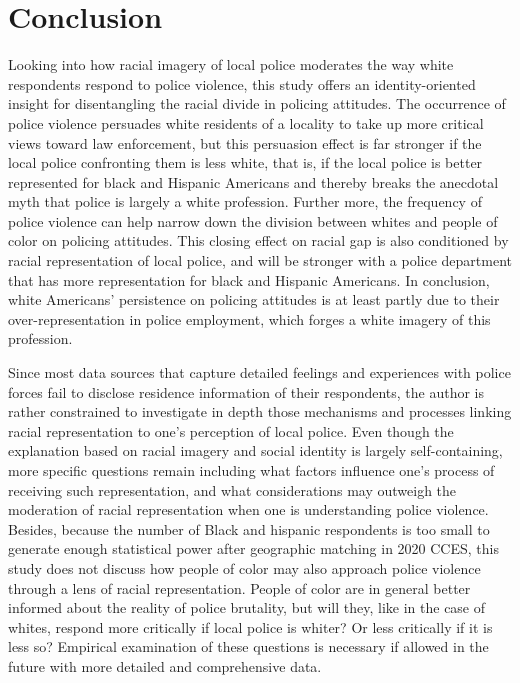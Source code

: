 \documentclass[
  12pt,
]{article}
\begin{document}
\hypertarget{conclusion}{%
\section{Conclusion}\label{conclusion}}

Looking into how racial imagery of local police moderates the way white
respondents respond to police violence, this study offers an
identity-oriented insight for disentangling the racial divide in
policing attitudes. The occurrence of police violence persuades white
residents of a locality to take up more critical views toward law
enforcement, but this persuasion effect is far stronger if the local
police confronting them is less white, that is, if the local police is
better represented for black and Hispanic Americans and thereby breaks
the anecdotal myth that police is largely a white profession. Further
more, the frequency of police violence can help narrow down the division
between whites and people of color on policing attitudes. This closing
effect on racial gap is also conditioned by racial representation of
local police, and will be stronger with a police department that has
more representation for black and Hispanic Americans. In conclusion,
white Americans' persistence on policing attitudes is at least partly
due to their over-representation in police employment, which forges a
white imagery of this profession.

Since most data sources that capture detailed feelings and experiences
with police forces fail to disclose residence information of their
respondents, the author is rather constrained to investigate in depth
those mechanisms and processes linking racial representation to one's
perception of local police. Even though the explanation based on racial
imagery and social identity is largely self-containing, more specific
questions remain including what factors influence one's process of
receiving such representation, and what considerations may outweigh the
moderation of racial representation when one is understanding police
violence. Besides, because the number of Black and hispanic respondents
is too small to generate enough statistical power after geographic
matching in 2020 CCES, this study does not discuss how people of color
may also approach police violence through a lens of racial
representation. People of color are in general better informed about the
reality of police brutality, but will they, like in the case of whites,
respond more critically if local police is whiter? Or less critically if
it is less so? Empirical examination of these questions is necessary if
allowed in the future with more detailed and comprehensive data.
\end{document}
